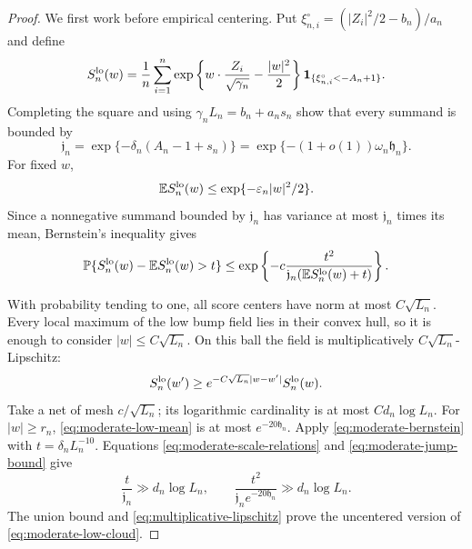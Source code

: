 \begin{proof}
We first work before empirical centering. Put
\(\xi_{n,i}^{\circ}=(|Z_i|^2/2-b_n)/a_n\) and define
\[
 S_n^{\rm lo}(w)
 =\frac1n\sum_{i=1}^n
   \exp\left\{w\cdot\frac{Z_i}{\sqrt{\gamma_n}}-\frac{|w|^2}{2}\right\}
   \mathbf1_{\{\xi_{n,i}^{\circ}<-A_n+1\}}.
\]
Completing the square and using
\(\gamma_nL_n=b_n+a_ns_n\) show that every summand is bounded by
\begin{equation}
\label{eq:moderate-jump-bound}
  \mathfrak j_n
  =\exp\{-\delta_n(A_n-1+s_n)\}
  =\exp\{-(1+o(1))\omega_n\mathfrak h_n\}.
\end{equation}
For fixed \(w\),
\begin{equation}
\label{eq:moderate-low-mean}
  \mathbb E S_n^{\rm lo}(w)
  \le \exp\{-\varepsilon_n|w|^2/2\}.
\end{equation}
Since a nonnegative summand bounded by \(\mathfrak j_n\) has variance at most
\(\mathfrak j_n\) times its mean, Bernstein's inequality gives
\begin{equation}
\label{eq:moderate-bernstein}
 \mathbb P\{S_n^{\rm lo}(w)-\mathbb E S_n^{\rm lo}(w)>t\}
 \le
 \exp\left\{-c\frac{t^2}
   {\mathfrak j_n(\mathbb E S_n^{\rm lo}(w)+t)}\right\}.
\end{equation}

With probability tending to one, all score centers have norm at most
\(C\sqrt{L_n}\). Every local maximum of the low bump field lies in their
convex hull, so it is enough to consider \(|w|\le C\sqrt{L_n}\). On this
ball the field is multiplicatively \(C\sqrt{L_n}\)-Lipschitz:
\begin{equation}
\label{eq:multiplicative-lipschitz}
  S_n^{\rm lo}(w')
  \ge e^{-C\sqrt{L_n}|w-w'|}S_n^{\rm lo}(w).
\end{equation}
Take a net of mesh \(c/\sqrt{L_n}\); its logarithmic cardinality is at most
\(C d_n\log L_n\). For \(|w|\ge r_n\),
\eqref{eq:moderate-low-mean} is at most \(e^{-20\mathfrak h_n}\). Apply
\eqref{eq:moderate-bernstein} with
\(t=\delta_nL_n^{-10}\). Equations
\eqref{eq:moderate-scale-relations} and \eqref{eq:moderate-jump-bound} give
\[
  \frac{t}{\mathfrak j_n}\gg d_n\log L_n,
  \qquad
  \frac{t^2}{\mathfrak j_ne^{-20\mathfrak h_n}}\gg d_n\log L_n.
\]
The union bound and \eqref{eq:multiplicative-lipschitz} prove the uncentered
version of \eqref{eq:moderate-low-cloud}.


\end{proof}
